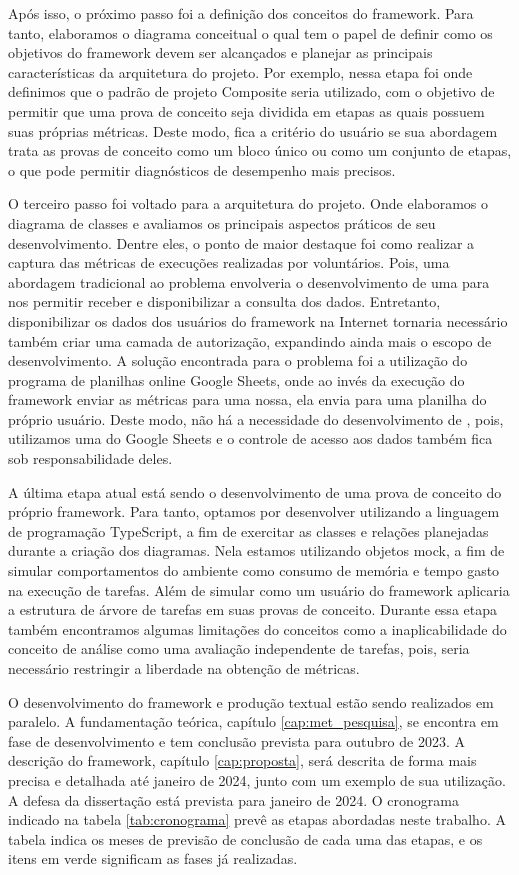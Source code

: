 \documentclass[12pt]{tcc}
\begin{document}
Após isso, o próximo passo foi a definição dos conceitos do framework.
Para tanto, elaboramos o diagrama conceitual o qual tem o papel de definir como os objetivos do framework devem ser alcançados e planejar as principais características da arquitetura do projeto.
Por exemplo, nessa etapa foi onde definimos que o padrão de projeto Composite seria utilizado, com o objetivo de permitir que uma prova de conceito seja dividida em etapas as quais possuem suas próprias métricas.
Deste modo, fica a critério do usuário se sua abordagem trata as provas de conceito como um bloco único ou como um conjunto de etapas, o que pode permitir diagnósticos de desempenho mais precisos.

O terceiro passo foi voltado para a arquitetura do projeto.
Onde elaboramos o diagrama de classes e avaliamos os principais aspectos práticos de seu desenvolvimento.
Dentre eles, o ponto de maior destaque foi como realizar a captura das métricas de execuções realizadas por voluntários.
Pois, uma abordagem tradicional ao problema envolveria o desenvolvimento de uma  para nos permitir receber e disponibilizar a consulta dos dados.
Entretanto, disponibilizar os dados dos usuários do framework na Internet tornaria necessário também criar uma camada de autorização, expandindo ainda mais o escopo de desenvolvimento.
A solução encontrada para o problema foi a utilização do programa de planilhas online Google Sheets, onde ao invés da execução do framework enviar as métricas para uma  nossa, ela envia para uma planilha do próprio usuário.
Deste modo, não há a necessidade do desenvolvimento de , pois, utilizamos uma do Google Sheets e o controle de acesso aos dados também fica sob responsabilidade deles.

A última etapa atual está sendo o desenvolvimento de uma prova de conceito do próprio framework.
Para tanto, optamos por desenvolver utilizando a linguagem de programação TypeScript, a fim de exercitar as classes e relações planejadas durante a criação dos diagramas.
Nela estamos utilizando objetos mock, a fim de simular comportamentos do ambiente como consumo de memória e tempo gasto na execução de tarefas.
Além de simular como um usuário do framework aplicaria a estrutura de árvore de tarefas em suas provas de conceito.
Durante essa etapa também encontramos algumas limitações do conceitos como a inaplicabilidade do conceito de análise como uma avaliação independente de tarefas, pois, seria necessário restringir a liberdade na obtenção de métricas.

O desenvolvimento do framework e produção textual estão sendo realizados em paralelo.
A fundamentação teórica, capítulo \ref{cap:met_pesquisa}, se encontra em fase de desenvolvimento e tem conclusão prevista para outubro de 2023.
A descrição do framework, capítulo \ref{cap:proposta}, será descrita de forma mais precisa e detalhada até janeiro de 2024, junto com um exemplo de sua utilização.
A defesa da dissertação está prevista para janeiro de 2024. O cronograma indicado na tabela \ref{tab:cronograma} prevê as etapas abordadas neste trabalho.
A tabela indica os meses de previsão de conclusão de cada uma das etapas, e os itens em verde significam as fases já realizadas.
\end{document}
